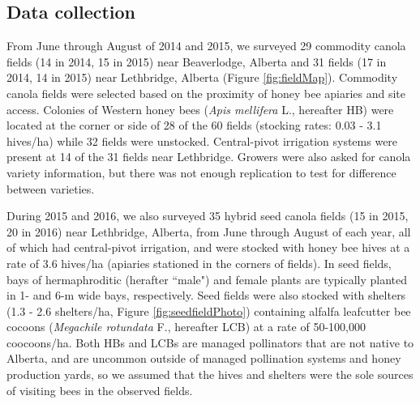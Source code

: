 \documentclass[12pt]{article} %
\begin{document}
\subsection*{Data collection}
From June through August of 2014 and 2015, we surveyed 29 commodity canola fields (14 in 2014, 15 in 2015) near Beaverlodge, Alberta and 31 fields (17 in 2014, 14 in 2015) near Lethbridge, Alberta (Figure \ref{fig:fieldMap}).
Commodity canola fields were selected based on the proximity of honey bee apiaries and site access. 
Colonies of Western honey bees (\emph{Apis mellifera} L., hereafter HB) were located at the corner or side of 28 of the 60 fields (stocking rates: 0.03 - 3.1 hives/ha) while 32 fields were unstocked. %
Central-pivot irrigation systems were present at 14 of the 31 fields near Lethbridge.
Growers were also asked for canola variety information, but there was not enough replication to test for difference between varieties.

During 2015 and 2016, we also surveyed 35 hybrid seed canola fields (15 in 2015, 20 in 2016) near Lethbridge, Alberta, from June through August of each year, all of which had central-pivot irrigation, and were stocked with honey bee hives at a rate of 3.6 hives/ha (apiaries stationed in the corners of fields).
In seed fields, bays of hermaphroditic (herafter ``male") and female plants are typically planted in 1- and 6-m wide bays, respectively. 
Seed fields were also stocked with shelters (1.3 - 2.6 shelters/ha, Figure \ref{fig:seedfieldPhoto}) containing alfalfa leafcutter bee cocoons (\textit{Megachile rotundata} F., hereafter LCB) at a rate of 50-100,000 coocoons/ha. 
Both HBs and LCBs are managed pollinators that are not native to Alberta, and are uncommon outside of managed pollination systems and honey production yards, so we assumed that the hives and shelters were the sole sources of visiting bees in the observed fields.

\end{document}
